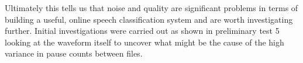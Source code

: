 

Ultimately this tells us that noise and quality are significant problems in terms of building a useful, online speech classification system and are worth investigating further. Initial investigations were carried out as shown in preliminary test 5 looking at the waveform itself to uncover what might be the cause of the high variance in pause counts between files. 

%
%
%	
%
%



%
%
%
%
%
%
%

